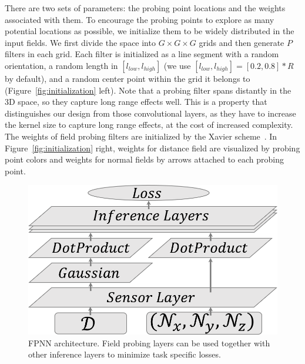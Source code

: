 There are two sets of parameters: the probing point locations and the weights associated with them. To encourage the probing points to explore as many potential locations as possible, we initialize them to be widely distributed in the input fields. We first divide the space into $G \times G \times G$ grids and then generate $P$ filters in each grid. Each filter is initialized as a line segment with a random orientation, a random length in $[l_{low}, l_{high}]$ (we use $[l_{low}, l_{high}]=[0.2, 0.8]*R$ by default), and a random center point within the grid it belongs to (Figure~\ref{fig:initialization} left). Note that a probing filter spans distantly in the 3D space, so they capture long range effects well. This is a property that distinguishes our design from those convolutional layers, as they have to increase the kernel size to capture long range effects, at the cost of increased complexity. The weights of field probing filters are initialized by the Xavier scheme~\cite{glorot2010understanding}. In Figure~\ref{fig:initialization} right, weights for distance field are visualized by probing point colors and weights for normal fields by arrows attached to each probing point.

\begin{figure}
	\vspace{-1.4cm}
	\begin{center}
		\includegraphics[width=1.0\linewidth]{figures/fpnn_architecture}
	\end{center}
	\vspace{-0.4cm}
	\caption{FPNN architecture. Field probing layers can be used together with other inference layers to minimize task specific losses.}
	\label{fig:fpnn_architecture}
	\vspace{-0.5cm}
\end{figure}

